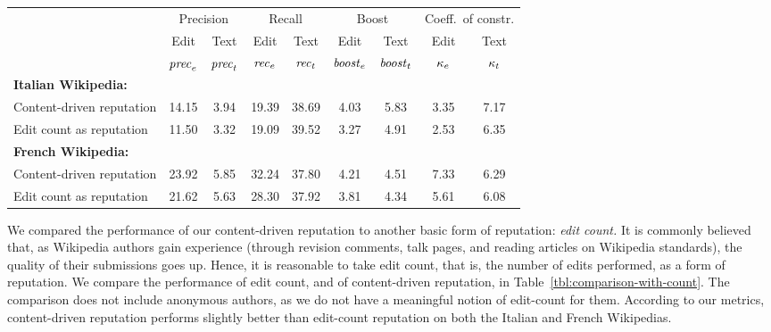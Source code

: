 \begin{sidewaystable}
\begin{center}
\begin{tabular}{|l||c|c||c|c||c|c||c|c|} \hline
 & \multicolumn{2}{|c||}{Precision}
 & \multicolumn{2}{|c||}{Recall}
 & \multicolumn{2}{|c||}{Boost}
 & \multicolumn{2}{|c|}{Coeff.\ of constr.} \\
 & Edit & Text & Edit & Text  & Edit & Text & Edit & Text \\
 & ${\text{\textit{prec}}}_e$ & ${\text{\textit{prec}}}_t$ & ${\text{\textit{rec}}}_e$ & ${\text{\textit{rec}}}_t$ & ${\text{\textit{boost}}}_e$ & ${\text{\textit{boost}}}_t$ 
 & $\kappa_e$ & $\kappa_t$ \\[0.5ex] \hline 
\textbf{Italian Wikipedia:} & & & & & & & & \\
\qquad Content-driven reputation & 14.15 &  3.94 & 19.39 & 38.69 & 4.03 & 5.83 & 3.35 & 7.17 \\
\qquad Edit count as reputation  & 11.50 &  3.32 & 19.09 & 39.52 & 3.27 & 4.91 & 2.53 & 6.35 \\ \hline
\textbf{French Wikipedia:} & & & & & & & & \\
\qquad Content-driven reputation & 23.92 &  5.85 & 32.24 & 37.80 & 4.21 & 4.51 & 7.33 & 6.29 \\
\qquad Edit count as reputation &  21.62 &  5.63 & 28.30 & 37.92 & 3.81 & 4.34 & 5.61 & 6.08 \\ \hline
\end{tabular}
\end{center}
\caption{Summary of the performance of content-driven reputation over
the Italian and French Wikipedias. All data are expressed as
percentages. Anonymous authors are not included in the comparison.
Precision is the probability that the text or edit longevity is low,
given that the reputation is low.
Recall is the probability that the reputation is low, given
that the text or edit longevity is low.
}
\label{tbl:comparison-with-count} 
\end{sidewaystable}


We compared the performance of our content-driven reputation to 
another basic form of reputation: {\em edit count.} 
It is commonly believed that, as Wikipedia authors gain experience
(through revision comments, talk pages, and reading articles on
Wikipedia standards), the quality of their submissions goes up.
Hence, it is reasonable to take edit count, that is, the number of
edits performed, as a form of reputation. 
We compare the performance of edit count, and of content-driven
reputation, in Table~\ref{tbl:comparison-with-count}. 
The comparison does not include anonymous authors, as we do not have a
meaningful notion of edit-count for them. 
According to our metrics, content-driven reputation
performs slightly better than edit-count reputation on both the Italian 
and French Wikipedias. 


